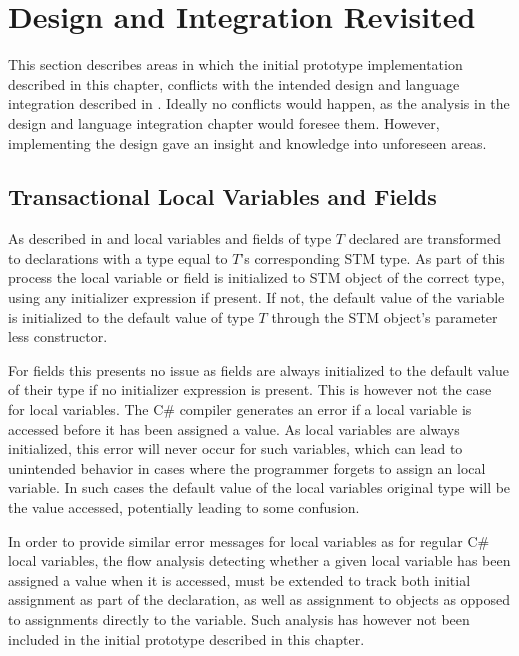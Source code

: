 
\section{Design and Integration Revisited}
This section describes areas in which the initial prototype implementation described in this chapter, conflicts with the intended design and language integration described in . Ideally no conflicts would happen, as the analysis in the design and language integration chapter would foresee them. However, implementing the design gave an insight and knowledge into unforeseen areas.

\subsection{Transactional Local Variables and Fields}
As described in  and  local variables and fields of type $T$ declared  are transformed to declarations with a type equal to $T$'s corresponding \ac{STM} type. As part of this process the local variable or field is initialized to \ac{STM} object of the correct type, using any initializer expression if present. If not, the default value of the variable is initialized to the default value of type $T$ through the \ac{STM} object's parameter less constructor. 

For fields this presents no issue as fields are always initialized to the default value of their type if no initializer expression is present\cite[p. 93]{csharp2013specificaiton}. This is however not the case for local variables. The C\# compiler generates an error if a local variable is accessed before it has been assigned a value\cite[p. 96]{csharp2013specificaiton}. As  local variables are always initialized, this error will never occur for such variables, which can lead to unintended behavior in cases where the programmer forgets to assign an  local variable. In such cases the default value of the  local variables original type will be the value accessed, potentially leading to some confusion.

In order to provide similar error messages for  local variables as for regular C\# local variables, the flow analysis detecting whether a given local variable has been assigned a value when it is accessed, must be extended to track both initial assignment as part of the declaration, as well as assignment to  objects  as opposed to assignments directly to the variable. Such analysis has however not been included in the initial prototype described in this chapter.

